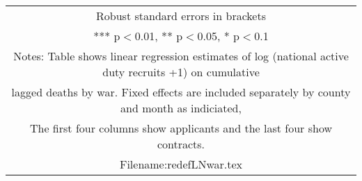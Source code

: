 \documentclass[]{article}
\begin{document}
\begin{tabular}{lcccc}
\multicolumn{5}{c}{ Robust standard errors in brackets} \\
\multicolumn{5}{c}{ *** p$<$0.01, ** p$<$0.05, * p$<$0.1} \\
\multicolumn{5}{c}{ Notes: Table shows linear regression estimates of log (national active duty recruits +1) on cumulative} \\
\multicolumn{5}{c}{ lagged deaths by war. Fixed effects are included separately by county and month as indiciated,} \\
\multicolumn{5}{c}{ The first four columns show applicants and the last four show contracts.} \\
\multicolumn{5}{c}{ Filename:redefLNwar.tex} \\
\end{tabular}
\end{document}
